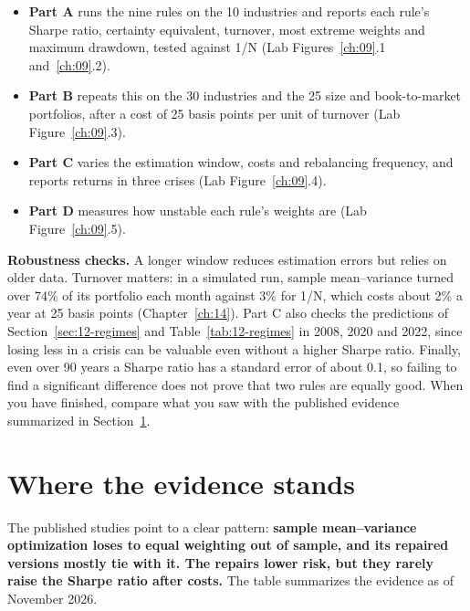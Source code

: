 \begin{itemize}
  \item \textbf{Part A} runs the nine rules on the 10 industries and reports each rule's Sharpe ratio, certainty equivalent, turnover, most extreme weights and maximum drawdown, tested against 1/N (Lab Figures~\ref{ch:09}.1 and~\ref{ch:09}.2).
  \item \textbf{Part B} repeats this on the 30 industries and the 25 size and book-to-market portfolios, after a cost of 25 basis points per unit of turnover (Lab Figure~\ref{ch:09}.3).
  \item \textbf{Part C} varies the estimation window, costs and rebalancing frequency, and reports returns in three crises (Lab Figure~\ref{ch:09}.4).
  \item \textbf{Part D} measures how unstable each rule's weights are (Lab Figure~\ref{ch:09}.5).
\end{itemize}

\label{sec:12-stress}
\textbf{Robustness checks.} A longer window reduces estimation errors but relies on older data. Turnover matters: in a simulated run, sample mean--variance turned over 74\% of its portfolio each month against 3\% for 1/N, which costs about 2\% a year at 25 basis points (Chapter~\ref{ch:14}). Part C also checks the predictions of Section~\ref{sec:12-regimes} and Table~\ref{tab:12-regimes} in 2008, 2020 and 2022, since losing less in a crisis can be valuable even without a higher Sharpe ratio. Finally, even over 90 years a Sharpe ratio has a standard error of about 0.1, so failing to find a significant difference does not prove that two rules are equally good. When you have finished, compare what you saw with the published evidence summarized in Section~\ref{sec:12-verdict}.

\section{Where the evidence stands}
\label{sec:12-verdict}

The published studies point to a clear pattern: \textbf{sample mean--variance optimization loses to equal weighting out of sample, and its repaired versions mostly tie with it. The repairs lower risk, but they rarely raise the Sharpe ratio after costs.} The table summarizes the evidence as of November 2026.

